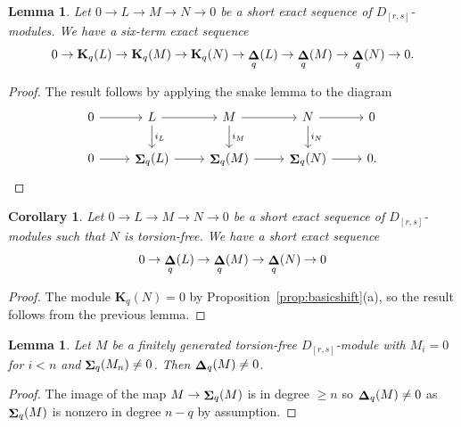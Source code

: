 \documentclass[12pt]{amsart}
\newcommand{\bK}{\mathbf{K}}
\DeclareMathOperator{\Sh}{\bf{\Sigma}}
\DeclareMathOperator{\De}{\bf{\Delta}}
\newcommand{\Drs}{D_{[r,s]}}
\newcommand{\mShq}{\Sh_{q}}
\newcommand{\mDeq}{\De_{q}}
\newcommand{\bKq}{{{\bK}_{q}}}
\numberwithin{equation}{section}
\newtheorem{lemma}[equation]{Lemma}
\newtheorem{corollary}[equation]{Corollary}
\theoremstyle{definition}
\theoremstyle{plain}
\begin{document}
\begin{lemma}\label{lem:handlingtorsion}
Let $0 \to L \to M \to N \to 0$ be a short exact sequence of $\Drs$-modules. We have a six-term exact sequence
   \begin{displaymath}
       0 \to \bKq(L) \to \bKq(M) \to \bKq(N) \to \mDeq(L) \to \mDeq(M) \to \mDeq(N) \to 0.
   \end{displaymath}
\end{lemma}
\begin{proof}
    The result follows by applying the snake lemma to the diagram
\begin{displaymath}
\begin{tikzcd}
  0 \arrow[r] & L \arrow[d, "i_L"] \arrow[r] & M \arrow[d, "i_M"] \arrow[r] & N\arrow[d, "i_N"] \arrow[r] & 0 \\
  0 \arrow[r] & \mShq(L) \arrow[r] & \mShq(M) \arrow[r] & \mShq(N) \ar[r] & 0.
\end{tikzcd}
\end{displaymath}
\end{proof}

\begin{corollary}\label{cor:handlingtorsion}
Let $0 \to L \to M \to N \to 0$ be a short exact sequence of $\Drs$-modules such that $N$ is torsion-free. We have a short exact sequence 
\begin{displaymath}
0 \to \mDeq(L) \to \mDeq(M) \to \mDeq(N) \to 0
\end{displaymath}
\end{corollary}
\begin{proof}
The module $\bKq(N) = 0$ by Proposition~\ref{prop:basicshift}(a), so the result follows from the previous lemma.
\end{proof}

\begin{lemma}\label{lem:dmzero}
    Let $M$ be a finitely generated torsion-free $\Drs$-module with $M_i = 0$ for $i < n$ and $\mShq(M_n) \ne 0$. Then $\mDeq(M) \ne 0$. 
\end{lemma}
\begin{proof}
    The image of the map $M \to \mShq(M)$ is in degree $\geq n$ so $\mDeq(M) \ne 0$ as $\mShq(M)$ is nonzero in degree $n-q$ by assumption.
\end{proof}
\end{document}

